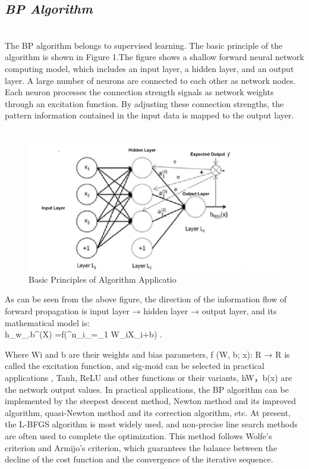 \documentclass{article}
\begin{document}
\subsection{\emph{BP Algorithm}}\\
The BP algorithm belongs to supervised learning. The basic principle of the algorithm is shown in 
Figure 1.The figure shows a shallow forward neural network computing model, which includes an 
input layer, a hidden layer, and an output layer. A large number of neurons are connected to each other 
as network nodes. Each neuron processes the connection strength signals as network weights through 
an excitation function. By adjusting these connection strengths, the pattern information contained in 
the input data is mapped to the output layer.\\\\
\begin{figure}
    \centering
    \includegraphics[width=1.0\linewidth]{figure.png}
    \caption{ Basic Principles of Algorithm Applicatio}
    \label{fig:my_label}
\end{figure}

As can be seen from the above figure, the direction of the information flow of forward propagation 
is input layer → hidden layer → output layer, and its mathematical model is:\\ 
h_w_.b^(X) =f(\sum^n_i_=_1      W_iX_i+b)
.

Where Wi and b are their weights and bias parameters, f (W, b; x): R 
→ R is called the excitation function, and sig-moid can be selected in practical applications , Tanh, 
ReLU and other functions or their variants, hW，b(x) are the network output values. In practical 
applications, the BP algorithm can be implemented by the steepest descent method, Newton method 
and its improved algorithm, quasi-Newton method and its correction algorithm, etc. At present, the 
L-BFGS algorithm is most widely used, and non-precise line search methods are often used to 
complete the optimization. This method follows Wolfe's criterion and Armijo's criterion, which 
guarantees the balance between the decline of the cost function and the convergence of the iterative 
sequence.\\\\
\end{document}

